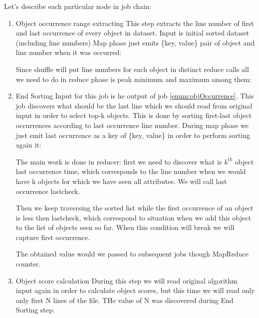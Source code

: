 \documentclass[a4paper]{article}
\begin{document}
Let's describe each particular node in job chain:
\begin{enumerate}
    \item Object occurrence range extracting \label{enum:objOccurrence}
    This step extracts the line number of first and last occurrence of every object in dataset.
    Input is initial sorted dataset (including line numbers)
    Map phase just emits \{key, value\} pair of object and line number when it was occurred:
    

    Since shuffle will put line numbers for each object in distinct reduce calls all we need to do in reduce phase is peak minimum and maximum among them: 
    

    \item End Sorting
    Input for this job is he output of job \ref{enum:objOccurrence}.
    This job discovers what should be the last line which we should read from original input in order to select top-k objects.
    This is done by sorting first-last object occurrences according to last occurrence line number.
    During map phase we just emit last occurrence as a key of \{key, value\} in order to perform sorting again it:
    

    The main work is done in reducer: first we need to discover what is $k^{th}$ object last occurrence time, which corresponds to the line number when we would have k objects for which we have seen all attributes.
    We will call last occurrence lastcheck.

    Then we keep traversing the sorted list while the first occurrence of an object is less then lastcheck, which correspond to situation when we add this object to the list of objects seen so far.
    When this condition will break we will capture first occurrence.
    

    The obtained value would we passed to subsequent jobs though MapReduce counter.

    \item Object score calculation
    During this step we will read original algorithm input again in order to calculate object scores, but this time we will read only only first N lines of the file. THe value of N was discovered during End Sorting step.


\end{enumerate}
\end{document}
